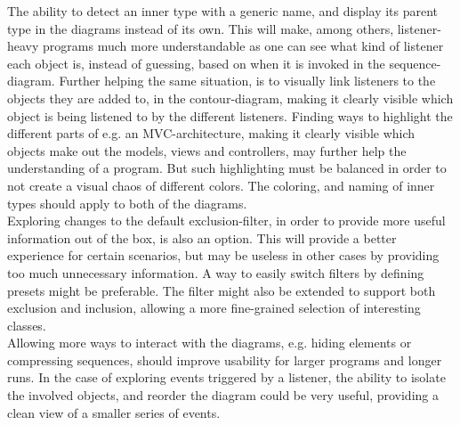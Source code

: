 The ability to detect an inner type with a generic name, and display its parent type in the diagrams instead of its own.
This will make, among others, listener-heavy programs much more understandable as one can see what kind of listener each object is, instead of guessing, based on when it is invoked in the sequence-diagram.%
Further helping the same situation, is to visually link listeners to the objects they are added to, in the contour-diagram, making it clearly visible which object is being listened to by the different listeners.%
Finding ways to highlight the different parts of e.g. an MVC-architecture, making it clearly visible which objects make out the models, views and controllers, may further help the understanding of a program.
But such highlighting must be balanced in order to not create a visual chaos of different colors.
The coloring, and naming of inner types should apply to both of the diagrams.
~\\

Exploring changes to the default exclusion-filter, in order to provide more useful information out of the box, is also an option.
This will provide a better experience for certain scenarios, but may be useless in other cases by providing too much unnecessary information.
A way to easily switch filters by defining presets might be preferable.
The filter might also be extended to support both exclusion and inclusion, allowing a more fine-grained selection of interesting classes.
~\\

Allowing more ways to interact with the diagrams, e.g. hiding elements or compressing sequences, should improve usability for larger programs and longer runs.
In the case of exploring events triggered by a listener, the ability to isolate the involved objects, and reorder the diagram could be very useful, providing a clean view of a smaller series of events.%
